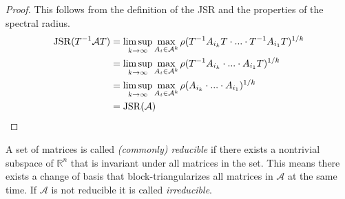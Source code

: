 \begin{proof}
    This follows from the definition of the JSR and the properties of the spectral radius.
    \begin{align*}
    \operatorname{JSR}(T^{-1}\mathcal{A}T) & = \limsup_{k \to \infty} \max_{A_i \in \mathcal{A}^k} \rho(T^{-1}A_{i_k}T \cdot ... \cdot T^{-1}A_{i_1}T)^{1/k}\\
    & = \limsup_{k \to \infty} \max_{A_i \in \mathcal{A}^k} \rho(T^{-1}A_{i_k} \cdot ... \cdot A_{i_1}T)^{1/k}\\
    & = \limsup_{k \to \infty} \max_{A_i \in \mathcal{A}^k} \rho(A_{i_k} \cdot ... \cdot A_{i_1})^{1/k}\\
    & = \operatorname{JSR}(\mathcal{A})   
    \end{align*}
\end{proof}

\begin{definition}
    A set of matrices is called \emph{(commonly) reducible} if there exists a nontrivial subspace of $\mathbb{R}^n$ that is invariant under all matrices in the set. This means there exists a change of basis that block-triangularizes all matrices in $\mathcal{A}$ at the same time. If $\mathcal{A}$ is not reducible it is called \emph{irreducible}. 
\end{definition}

